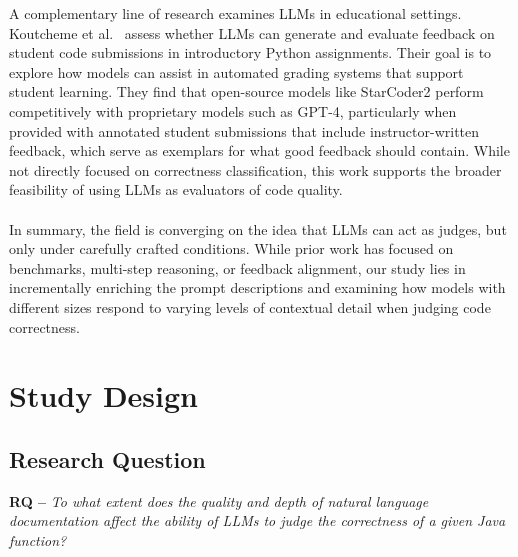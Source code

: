\documentclass[a4paper]{usiinfbachelorproject}
\begin{document}
A complementary line of research examines LLMs in educational settings. Koutcheme et al.~\cite{koutcheme2025evaluating} assess whether LLMs can generate and evaluate feedback on student code submissions in introductory Python assignments. Their goal is to explore how models can assist in automated grading systems that support student learning. They find that open-source models like StarCoder2 perform competitively with proprietary models such as GPT-4, particularly when provided with annotated student submissions that include instructor-written feedback, which serve as exemplars for what good feedback should contain. While not directly focused on correctness classification, this work supports the broader feasibility of using LLMs as evaluators of code quality.\\
\\[2pt]
In summary, the field is converging on the idea that LLMs can act as judges, but only under carefully crafted conditions. While prior work has focused on benchmarks, multi-step reasoning, or feedback alignment, our study lies in incrementally enriching the prompt descriptions and examining how models with different sizes respond to varying levels of contextual detail when judging code correctness.

\section{Study Design}\label{sec:design}

\subsection*{Research Question}
\noindent\textbf{RQ –} \emph{To what extent does the quality and depth of natural language documentation affect the ability of LLMs to judge the correctness of a given Java function?}
\end{document}
